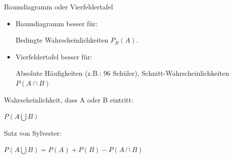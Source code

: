 \documentclass[paper=a6,landscape,ngerman,twoside=true,fontsize=12pt]{scrartcl}
\begin{document}
\begin{frage}
	Baumdiagramm oder Vierfeldertafel
\end{frage}
\begin{antwort}
	\begin{itemize}
		\item Baumdiagramm besser für:
		
		Bedingte Wahrscheinlichkeiten $P_B(A)$.
		
		\item Vierfeldertafel besser für:
		
		Absolute Häufigkeiten (z.B.: 96 Schüler), Schnitt-Wahrscheinlichkeiten $P(A\cap B)$
	\end{itemize}
\end{antwort}
\begin{frage}
	Wahrscheinlichkeit, dass A oder B eintritt: 
	
	$P(A\bigcup B)$
\end{frage}
\begin{antwort}
	Satz von Sylvester:
	
	$P(A\bigcup B)=P(A)+P(B)- P(A\cap B)$
	\bigskip
	
\begin{center}
\end{center}
\end{antwort}
\end{document}
